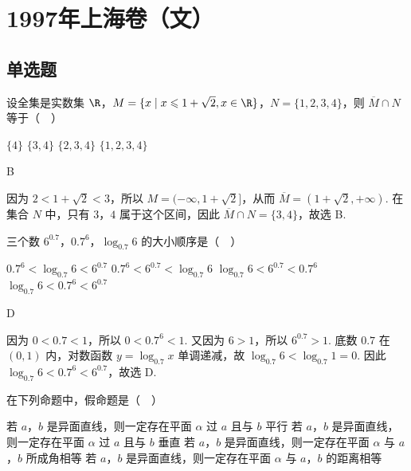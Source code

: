 \documentclass[UTF8,a4paper,oneside,11pt]{ctexbook}
\begin{document}
\mainmatter

\chapter{1997年上海卷（文）}
\section{单选题}

\begin{problem}
设全集是实数集 \(\R\)，\(M = \{x \mid x \leqslant 1 + \sqrt{2}, x \in \R\}\)，\(N = \{1, 2, 3, 4\}\)，则 \(\overline{M} \cap N\) 等于（\(\quad\)）

\choices
    {\(\{4\}\)}
    {\(\{3,4\}\)}
    {\(\{2,3,4\}\)}
    {\(\{1,2,3,4\}\)}
\end{problem}

\begin{answer}
B
\end{answer}

\begin{solution}
因为 \(2<1+\sqrt{2}<3\)，所以 \(M=(-\infty,1+\sqrt{2}]\)，从而 \(\overline{M}=(1+\sqrt{2},+\infty)\). 在集合 \(N\) 中，只有 \(3\)，\(4\) 属于这个区间，因此 \(\overline{M}\cap N=\{3,4\}\)，故选 B.
\end{solution}

\begin{problem}
三个数 \(6^{0.7}\)，\(0.7^{6}\)，\(\log_{0.7}6\) 的大小顺序是（\(\quad\)）

\choices
    {\(0.7^{6} < \log_{0.7}6 < 6^{0.7}\)}
    {\(0.7^{6} < 6^{0.7} < \log_{0.7}6\)}
    {\(\log_{0.7}6<6^{0.7}<0.7^{6}\)}
    {\(\log_{0.7}6<0.7^{6}<6^{0.7}\)}
\end{problem}

\begin{answer}
D
\end{answer}

\begin{solution}
因为 \(0<0.7<1\)，所以 \(0<0.7^6<1\). 又因为 \(6>1\)，所以 \(6^{0.7}>1\). 底数 \(0.7\) 在 \((0,1)\) 内，对数函数 \(y=\log_{0.7}x\) 单调递减，故 \(\log_{0.7}6<\log_{0.7}1=0\). 因此 \(\log_{0.7}6<0.7^6<6^{0.7}\)，故选 D.
\end{solution}

\begin{problem}
在下列命题中，假命题是（\(\quad\)）

\choices
    {若 \(a\)，\(b\) 是异面直线，则一定存在平面 \(\alpha\) 过 \(a\) 且与 \(b\) 平行}
    {若 \(a\)，\(b\) 是异面直线，则一定存在平面 \(\alpha\) 过 \(a\) 且与 \(b\) 垂直}
    {若 \(a\)，\(b\) 是异面直线，则一定存在平面 \(\alpha\) 与 \(a\)，\(b\) 所成角相等}
    {若 \(a\)，\(b\) 是异面直线，则一定存在平面 \(\alpha\) 与 \(a\)，\(b\) 的距离相等}
\end{problem}
\end{document}
